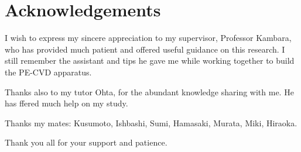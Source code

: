 \chapter{Acknowledgements}
I  wish to express my sincere appreciation to my supervisor, Professor Kambara, who has provided much patient and offered useful guidance on this research.  I still remember the assistant and tips  he gave me while working together to  build the  PE-CVD apparatus. 

Thanks also to my tutor Ohta, for the abundant knowledge sharing with me. He has ffered much help on my study. 

Thanks my mates: Kusumoto, Ishbashi, Sumi, Hamasaki, Murata, Miki, Hiraoka. 

Thank you all for your support and patience. 
       

